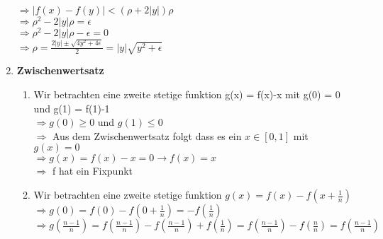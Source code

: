 \documentclass[8pt]{extreport}
\begin{document}
\begin{enumerate}[label = \textbf{6.\arabic*}]
$\Rightarrow |f(x) -f(y)| < (\rho + 2|y|)\rho$\\
$\Rightarrow \rho^2 - 2|y|\rho = \epsilon$\\
$\Rightarrow \rho^2 -2|y|\rho -\epsilon = 0$\\
$\Rightarrow \rho = \frac{2|y| \pm \sqrt{4y^2 + 4\epsilon}}{2} = |y|\sqrt{y^2 + \epsilon}$
\item \textbf{Zwischenwertsatz}
\begin{enumerate}[label = (\alph*)]
\item Wir betrachten eine zweite stetige funktion g(x) = f(x)-x mit g(0) = 0 und g(1) = f(1)-1\\
$\Rightarrow g(0) \geq 0$ und $g(1) \leq 0$\\
$\Rightarrow$ Aus dem Zwischenwertsatz folgt dass es ein $x \in [0,1]$ mit $g(x) = 0$\\
$\Rightarrow g(x) = f(x) - x = 0 \rightarrow f(x) = x$\\
$\Rightarrow$ f hat ein Fixpunkt
\item Wir betrachten eine zweite stetige funktion $g(x) = f(x) -f(x + \frac{1}{n})$\\
$\Rightarrow g(0) = f(0) - f(0 + \frac{1}{n}) = -f(\frac{1}{n})$\\
$\Rightarrow g(\frac{n-1}{n}) = f(\frac{n-1}{n}) - f(\frac{n-1}{n}) +f(\frac{1}{n}) = f(\frac{n-1}{n}) - f(\frac{n}{n}) = f(\frac{n-1}{n})$
\end{enumerate}
\end{enumerate}
\end{document}
